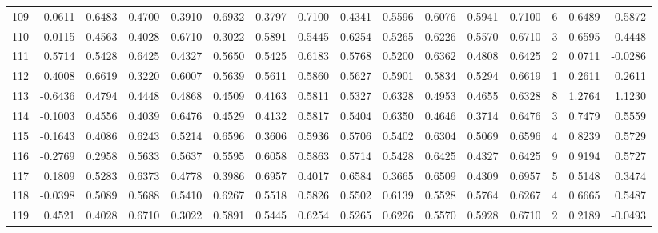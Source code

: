 \begin{tabular}{lrrrrrrrrrrrrrrr}
109 &      0.0611 &  0.6483 &  0.4700 &  0.3910 &  0.6932 &  0.3797 &  0.7100 &  0.4341 &  0.5596 &  0.6076 &   0.5941 &     0.7100 &      6 &                    0.6489 &                     0.5872 \\
110 &      0.0115 &  0.4563 &  0.4028 &  0.6710 &  0.3022 &  0.5891 &  0.5445 &  0.6254 &  0.5265 &  0.6226 &   0.5570 &     0.6710 &      3 &                    0.6595 &                     0.4448 \\
111 &      0.5714 &  0.5428 &  0.6425 &  0.4327 &  0.5650 &  0.5425 &  0.6183 &  0.5768 &  0.5200 &  0.6362 &   0.4808 &     0.6425 &      2 &                    0.0711 &                    -0.0286 \\
112 &      0.4008 &  0.6619 &  0.3220 &  0.6007 &  0.5639 &  0.5611 &  0.5860 &  0.5627 &  0.5901 &  0.5834 &   0.5294 &     0.6619 &      1 &                    0.2611 &                     0.2611 \\
113 &     -0.6436 &  0.4794 &  0.4448 &  0.4868 &  0.4509 &  0.4163 &  0.5811 &  0.5327 &  0.6328 &  0.4953 &   0.4655 &     0.6328 &      8 &                    1.2764 &                     1.1230 \\
114 &     -0.1003 &  0.4556 &  0.4039 &  0.6476 &  0.4529 &  0.4132 &  0.5817 &  0.5404 &  0.6350 &  0.4646 &   0.3714 &     0.6476 &      3 &                    0.7479 &                     0.5559 \\
115 &     -0.1643 &  0.4086 &  0.6243 &  0.5214 &  0.6596 &  0.3606 &  0.5936 &  0.5706 &  0.5402 &  0.6304 &   0.5069 &     0.6596 &      4 &                    0.8239 &                     0.5729 \\
116 &     -0.2769 &  0.2958 &  0.5633 &  0.5637 &  0.5595 &  0.6058 &  0.5863 &  0.5714 &  0.5428 &  0.6425 &   0.4327 &     0.6425 &      9 &                    0.9194 &                     0.5727 \\
117 &      0.1809 &  0.5283 &  0.6373 &  0.4778 &  0.3986 &  0.6957 &  0.4017 &  0.6584 &  0.3665 &  0.6509 &   0.4309 &     0.6957 &      5 &                    0.5148 &                     0.3474 \\
118 &     -0.0398 &  0.5089 &  0.5688 &  0.5410 &  0.6267 &  0.5518 &  0.5826 &  0.5502 &  0.6139 &  0.5528 &   0.5764 &     0.6267 &      4 &                    0.6665 &                     0.5487 \\
119 &      0.4521 &  0.4028 &  0.6710 &  0.3022 &  0.5891 &  0.5445 &  0.6254 &  0.5265 &  0.6226 &  0.5570 &   0.5928 &     0.6710 &      2 &                    0.2189 &                    -0.0493 \\

\end{tabular}
